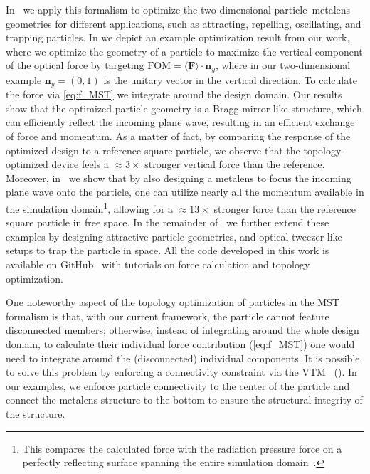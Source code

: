 In~\cite{ownpub2} we apply this formalism to optimize the two-dimensional particle--metalens geometries for different applications, such as attracting, repelling, 
oscillating, and trapping particles. In  we depict an example optimization result from our work, where 
we optimize the geometry of a particle to maximize the vertical component of the optical force by targeting $\text{FOM} = \langle\mathbf{F}\rangle \cdot \mathbf{n}_y$, where
in our two-dimensional example $\mathbf{n}_y = (0, 1)$ is the unitary vector in the vertical direction. To calculate the force via \eqref{eq:f_MST} we integrate around the design domain. Our results show that the optimized particle geometry is a Bragg-mirror-like
structure, which can efficiently reflect the incoming plane wave, resulting in an efficient exchange of force and momentum. As a matter of fact, by comparing the response of the optimized design
to a reference square particle, we observe that the topology-optimized device feels a $\approx 3\times$ stronger vertical force than the reference.
 Moreover, in~\cite{ownpub2} we show that by also designing a metalens to focus the incoming plane wave onto the particle, one can utilize nearly all the momentum available in the simulation domain\footnote{This compares the calculated force with the radiation pressure force on a perfectly reflecting surface spanning the entire simulation domain~\cite{ownpub2}.},
 allowing for a $\approx 13\times$ stronger force than the reference square particle in free space. 
 In the remainder of~\cite{ownpub2} we further extend these examples by designing
attractive particle geometries, and optical-tweezer-like setups to trap the particle in space. All the code developed in this work is available on GitHub~\cite{github_MST} with tutorials on force calculation and topology optimization. 

One noteworthy aspect of the topology optimization of particles in the MST formalism is that, with our current framework, the particle cannot feature disconnected members; otherwise, instead of integrating around the whole design domain, to calculate their individual force contribution (\eqref{eq:f_MST})
one would need to integrate around the (disconnected) individual components. It is possible to solve this problem by enforcing 
a connectivity constraint via the VTM~\cite{li_structural_2016} (). In our examples,
we enforce particle connectivity to the center of the particle and connect the metalens structure to the bottom to ensure the structural
integrity of the structure.

